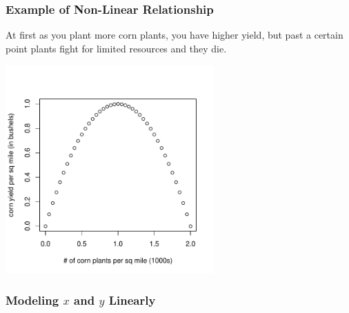 \documentclass[handout]{beamer}
\newcommand{\blue}[1]{\textcolor{blue2}{#1}}
\begin{document}
\begin{frame}[fragile]
\frametitle{Example of Non-Linear Relationship}
At first as you plant more corn plants, you have higher yield, but past a certain point plants fight for limited resources and they die. 
\begin{center}
\includegraphics[width=0.6\textwidth]{figure/nonlinear.pdf}
\end{center}
   
\end{frame}


\begin{frame}
\frametitle{Modeling $x$ and $y$ Linearly}
%
%

\end{frame}
\end{document}
